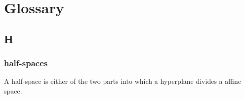 \documentclass{book}
\begin{document}
    \chapter{Glossary}
    \section*{H}
    \subsection*{half-spaces}  

A half-space is either of the two parts into which a hyperplane divides a affine space. 
    
\end{document}
